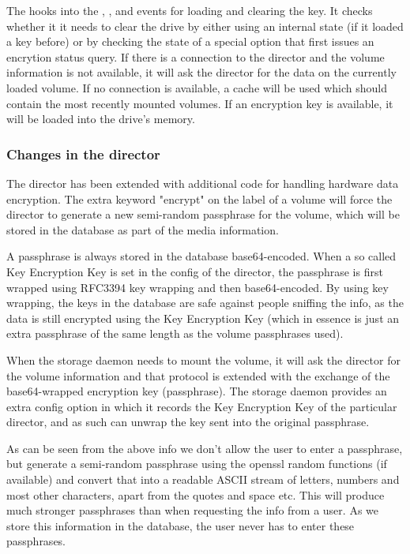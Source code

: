 The  hooks into the , ,  and  events for loading and clearing the key. It checks whether it it needs to clear the drive by either using an internal state (if it loaded a key before) or by checking the state of a special option that first issues an encrytion status query. If there is a connection to the director and the volume information is not available, it will ask the director for the data on the currently loaded volume. If no connection is available, a cache will be used which should contain the most recently mounted volumes. If an encryption key is available, it will be loaded into the drive's memory.

\subsubsection{Changes in the director}

The director has been extended with additional code for handling hardware data encryption. The extra keyword "encrypt" on the label of a volume will force the director to generate a new semi-random passphrase for the volume, which will be stored in the database as part of the media information.

A passphrase is always stored in the database base64-encoded. When a so called Key Encryption Key is set in the config of the director, the passphrase is first wrapped using RFC3394 key wrapping and then base64-encoded. By using key wrapping, the keys in the database are safe against people sniffing the info, as the data is still encrypted using the Key Encryption Key (which in essence is just an extra passphrase of the same length as the volume passphrases used).

When the storage daemon needs to mount the volume, it will ask the director for the volume information and that protocol is extended with the exchange of the base64-wrapped encryption key (passphrase). The storage daemon provides an extra config option in which it records the Key Encryption Key of the particular director, and as such can unwrap the key sent into the original passphrase.

As can be seen from the above info we don't allow the user to enter a passphrase, but generate a semi-random passphrase using the openssl random functions (if available) and convert that into a readable ASCII stream of letters, numbers and most other characters, apart from the quotes and space etc. This will produce much stronger passphrases than when requesting the info from a user. As we store this information in the database, the user never has to enter these passphrases.

